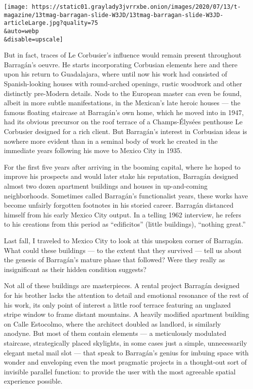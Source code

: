 \texttt{[image: https://static01.graylady3jvrrxbe.onion/images/2020/07/13/t-magazine/13tmag-barragan-slide-W3JD/13tmag-barragan-slide-W3JD-articleLarge.jpg?quality=75\\\&auto=webp\\\&disable=upscale]}

But in fact, traces of Le Corbusier's influence would remain present
throughout Barragán's oeuvre. He starts incorporating Corbusian elements
here and there upon his return to Guadalajara, where until now his work
had consisted of Spanish-looking houses with round-arched openings,
rustic woodwork and other distinctly pre-Modern details. Nods to the
European master can even be found, albeit in more subtle manifestations,
in the Mexican's late heroic houses --- the famous floating staircase at
Barragán's own home, which he moved into in 1947, had its obvious
precursor on the roof terrace of a Champs-Élysées penthouse Le Corbusier
designed for a rich client. But Barragán's interest in Corbusian ideas
is nowhere more evident than in a seminal body of work he created in the
immediate years following his move to Mexico City in 1935.

For the first five years after arriving in the booming capital, where he
hoped to improve his prospects and would later stake his reputation,
Barragán designed almost two dozen apartment buildings and houses in
up-and-coming neighborhoods. Sometimes called Barragán's functionalist
years, these works have become unfairly forgotten footnotes in his
storied career. Barragán distanced himself from his early Mexico City
output. In a telling 1962 interview, he refers to his creations from
this period as ``edificitos'' (little buildings), ``nothing great.''

Last fall, I traveled to Mexico City to look at this unspoken corner of
Barragán. What could these buildings --- to the extent that they
survived --- tell us about the genesis of Barragán's mature phase that
followed? Were they really as insignificant as their hidden condition
suggests?

Not all of these buildings are masterpieces. A rental project Barragán
designed for his brother lacks the attention to detail and emotional
resonance of the rest of his work, its only point of interest a little
roof terrace featuring an unglazed stripe window to frame distant
mountains. A heavily modified apartment building on Calle Estocolmo,
where the architect doubled as landlord, is similarly anodyne. But most
of them contain elements --- a meticulously modulated staircase,
strategically placed skylights, in some cases just a simple,
unnecessarily elegant metal mail slot --- that speak to Barragán's
genius for imbuing space with wonder and enveloping even the most
pragmatic projects in a thought-out sort of invisible parallel function:
to provide the user with the most agreeable spatial experience possible.

